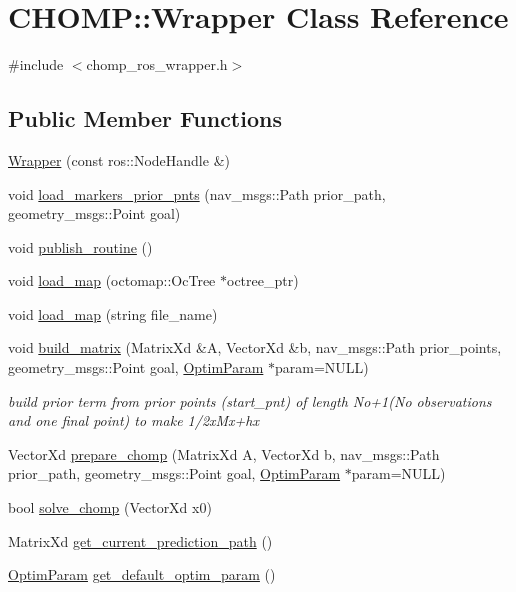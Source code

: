 \hypertarget{class_c_h_o_m_p_1_1_wrapper}{}\section{C\+H\+O\+MP\+:\+:Wrapper Class Reference}
\label{class_c_h_o_m_p_1_1_wrapper}


{\ttfamily \#include $<$chomp\+\_\+ros\+\_\+wrapper.\+h$>$}

\subsection*{Public Member Functions}
\begin{DoxyCompactItemize}
\item 
\hyperlink{class_c_h_o_m_p_1_1_wrapper_a6eb8cdd0f948a2a5e698c66e890e8e0e}{Wrapper} (const ros\+::\+Node\+Handle \&)
\item 
void \hyperlink{class_c_h_o_m_p_1_1_wrapper_a6ddf801481c8cb4d567ea7cb073a819b}{load\+\_\+markers\+\_\+prior\+\_\+pnts} (nav\+\_\+msgs\+::\+Path prior\+\_\+path, geometry\+\_\+msgs\+::\+Point goal)
\item 
void \hyperlink{class_c_h_o_m_p_1_1_wrapper_a84f5c4690636e65aca526e6e5b8abcf4}{publish\+\_\+routine} ()
\item 
void \hyperlink{class_c_h_o_m_p_1_1_wrapper_a095c001d0a11f0fa4229e38f602e5931}{load\+\_\+map} (octomap\+::\+Oc\+Tree $\ast$octree\+\_\+ptr)
\item 
void \hyperlink{class_c_h_o_m_p_1_1_wrapper_a93b14d4809f5bf3170473fc10a93a755}{load\+\_\+map} (string file\+\_\+name)
\item 
void \hyperlink{class_c_h_o_m_p_1_1_wrapper_ab51d0a655ed4b03ca3225c0af737f2dc}{build\+\_\+matrix} (Matrix\+Xd \&A, Vector\+Xd \&b, nav\+\_\+msgs\+::\+Path prior\+\_\+points, geometry\+\_\+msgs\+::\+Point goal, \hyperlink{struct_c_h_o_m_p_1_1_optim_param}{Optim\+Param} $\ast$param=N\+U\+LL)
\begin{DoxyCompactList}\small\item\em build prior term from prior points (start\+\_\+pnt) of length No+1(No observations and one final point) to make 1/2x\textquotesingle{}Mx+hx \end{DoxyCompactList}\item 
Vector\+Xd \hyperlink{class_c_h_o_m_p_1_1_wrapper_a138ac0d5088055c3698d93bbf9432126}{prepare\+\_\+chomp} (Matrix\+Xd A, Vector\+Xd b, nav\+\_\+msgs\+::\+Path prior\+\_\+path, geometry\+\_\+msgs\+::\+Point goal, \hyperlink{struct_c_h_o_m_p_1_1_optim_param}{Optim\+Param} $\ast$param=N\+U\+LL)
\item 
bool \hyperlink{class_c_h_o_m_p_1_1_wrapper_ac8fa793a31b7872feccc711c55c1da20}{solve\+\_\+chomp} (Vector\+Xd x0)
\item 
Matrix\+Xd \hyperlink{class_c_h_o_m_p_1_1_wrapper_ae94071b38bb2cd68d4a281c9f93e9587}{get\+\_\+current\+\_\+prediction\+\_\+path} ()
\item 
\hyperlink{struct_c_h_o_m_p_1_1_optim_param}{Optim\+Param} \hyperlink{class_c_h_o_m_p_1_1_wrapper_ac31da0a2c980d5b64541852f01deebbf}{get\+\_\+default\+\_\+optim\+\_\+param} ()
\end{DoxyCompactItemize}
